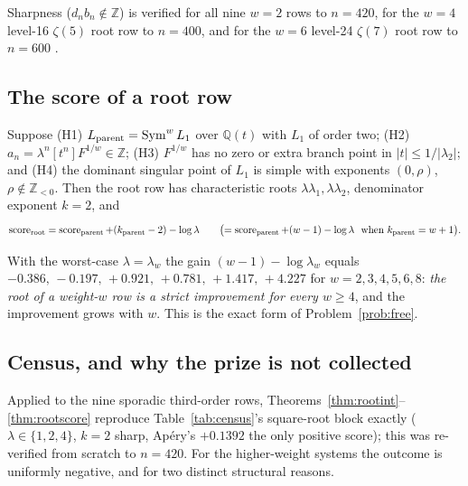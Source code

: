 Sharpness ($d_nb_n\notin\mathbb Z$) is verified for all nine $w=2$ rows to $n=420$, for the
$w=4$ level-16 $\zeta(5)$ root row to $n=400$, and for the $w=6$ level-24 $\zeta(7)$ root row
to $n=600$ .

\subsection{The score of a root row}

\begin{theorem}\label{thm:rootscore}
\Proved{} Suppose \textup{(H1)} $L_{\rm parent}=\operatorname{Sym}^wL_1$ over $\mathbb Q(t)$
with $L_1$ of order two; \textup{(H2)} $a_n=\lambda^n[t^n]F^{1/w}\in\mathbb Z$;
\textup{(H3)} $F^{1/w}$ has no zero or extra branch point in $|t|\le1/|\lambda_2|$; and
\textup{(H4)} the dominant singular point of $L_1$ is simple with exponents $(0,\rho)$,
$\rho\notin\mathbb Z_{<0}$. Then the root row has characteristic roots
$\lambda\lambda_1,\lambda\lambda_2$, denominator exponent $k=2$, and
\[
\operatorname{score}_{\rm root}=\operatorname{score}_{\rm parent}+(k_{\rm parent}-2)-\log\lambda
\qquad\bigl(=\operatorname{score}_{\rm parent}+(w-1)-\log\lambda\ \text{ when }k_{\rm parent}=w+1\bigr).
\]
\end{theorem}

With the worst-case $\lambda=\lambda_w$ the gain $(w-1)-\log\lambda_w$ equals
$-0.386,\,-0.197,\,+0.921,\,+0.781,\,+1.417,\,+4.227$ for $w=2,3,4,5,6,8$: \emph{the root of a
weight-$w$ row is a strict improvement for every $w\ge4$}, and the improvement grows with $w$.
This is the exact form of Problem~\ref{prob:free}.

\subsection{Census, and why the prize is not collected}

Applied to the nine sporadic third-order rows, Theorems~\ref{thm:rootint}--\ref{thm:rootscore}
reproduce Table~\ref{tab:census}'s square-root block exactly ($\lambda\in\{1,2,4\}$, $k=2$
sharp, Apéry's $+0.1392$ the only positive score); this was re-verified from scratch to
$n=420$. For the higher-weight systems the outcome is uniformly negative, and for two
distinct structural reasons.

